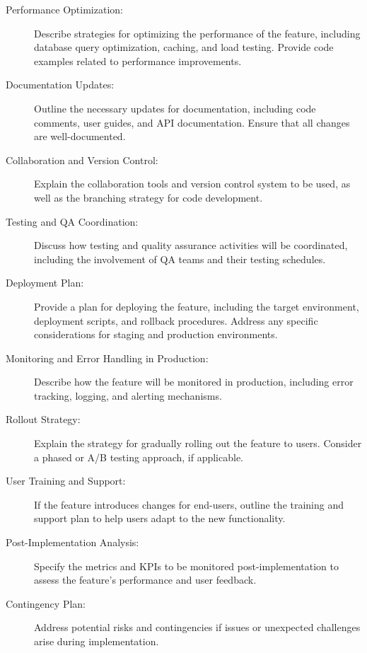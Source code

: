 \documentclass{article}
\begin{document}
\begin{description}
    \item[Performance Optimization:]
    Describe strategies for optimizing the performance of the feature, including database query optimization, caching, and load testing. Provide code examples related to performance improvements.

    \item[Documentation Updates:]
    Outline the necessary updates for documentation, including code comments, user guides, and API documentation. Ensure that all changes are well-documented.

    \item[Collaboration and Version Control:]
    Explain the collaboration tools and version control system to be used, as well as the branching strategy for code development.

    \item[Testing and QA Coordination:]
    Discuss how testing and quality assurance activities will be coordinated, including the involvement of QA teams and their testing schedules.

    \item[Deployment Plan:]
    Provide a plan for deploying the feature, including the target environment, deployment scripts, and rollback procedures. Address any specific considerations for staging and production environments.

    \item[Monitoring and Error Handling in Production:]
    Describe how the feature will be monitored in production, including error tracking, logging, and alerting mechanisms.

    \item[Rollout Strategy:]
    Explain the strategy for gradually rolling out the feature to users. Consider a phased or A/B testing approach, if applicable.

    \item[User Training and Support:]
    If the feature introduces changes for end-users, outline the training and support plan to help users adapt to the new functionality.

    \item[Post-Implementation Analysis:]
    Specify the metrics and KPIs to be monitored post-implementation to assess the feature's performance and user feedback.

    \item[Contingency Plan:]
    Address potential risks and contingencies if issues or unexpected challenges arise during implementation.


\end{description}
\end{document}
